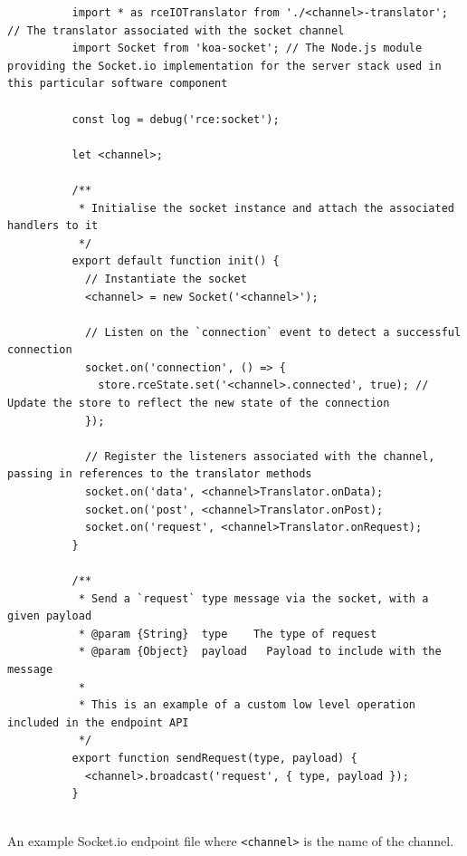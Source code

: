       \begin{code}
        \begin{verbatim}
          import * as rceIOTranslator from './<channel>-translator'; // The translator associated with the socket channel
          import Socket from 'koa-socket'; // The Node.js module providing the Socket.io implementation for the server stack used in this particular software component
          
          const log = debug('rce:socket');
          
          let <channel>;
          
          /**
           * Initialise the socket instance and attach the associated handlers to it
           */
          export default function init() {
            // Instantiate the socket
            <channel> = new Socket('<channel>');
          
            // Listen on the `connection` event to detect a successful connection
            socket.on('connection', () => {
              store.rceState.set('<channel>.connected', true); // Update the store to reflect the new state of the connection
            });
            
            // Register the listeners associated with the channel, passing in references to the translator methods
            socket.on('data', <channel>Translator.onData);
            socket.on('post', <channel>Translator.onPost);
            socket.on('request', <channel>Translator.onRequest);
          }
          
          /**
           * Send a `request` type message via the socket, with a given payload
           * @param	{String}  type    The type of request
           * @param {Object}  payload	Payload to include with the message
           *
           * This is an example of a custom low level operation included in the endpoint API
           */
          export function sendRequest(type, payload) {
            <channel>.broadcast('request', { type, payload });
          }
          
        \end{verbatim}
        \caption{An example Socket.io endpoint file where \texttt{<channel>} is the name of the channel.}
        \label{code:softDev-socketEndpointExample}
      \end{code}
    
